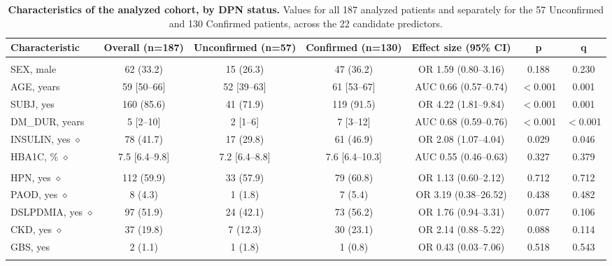 \documentclass[pdflatex,sn-mathphys-num]{sn-jnl}%
\theoremstyle{thmstyleone}%
\theoremstyle{thmstyletwo}%
\theoremstyle{thmstylethree}%
\begin{document}
\begin{table}[!tbp]
    \centering
    \footnotesize
    \caption{\textbf{Characteristics of the analyzed cohort, by DPN status.} Values for
    all 187 analyzed patients and separately for the 57 Unconfirmed and 130 Confirmed patients,
    across the 22 candidate predictors.}
    \label{tab:cohort}
    \setlength{\tabcolsep}{1pt}
    \tiny
    \begin{tabular}{lcccccc}
        \toprule
        \textbf{Characteristic} & \textbf{Overall} (n=187) & \textbf{Unconfirmed} (n=57) & \textbf{Confirmed} (n=130) & \textbf{Effect size (95\% CI)} & \textbf{p} & \textbf{q} \\
        \midrule
        \addlinespace
        \multicolumn{7}{l}{\textit{Profile}} \\
        SEX, male  & 62 (33.2) & 15 (26.3) & 47 (36.2) & OR 1.59 (0.80--3.16) & 0.188 & 0.230 \\
        AGE, years  & 59 [50--66] & 52 [39--63] & 61 [53--67] & AUC 0.66 (0.57--0.74) & $<$0.001 & 0.001 \\
        SUBJ, yes  & 160 (85.6) & 41 (71.9) & 119 (91.5) & OR 4.22 (1.81--9.84) & $<$0.001 & 0.001 \\
        DM\_DUR, years  & 5 [2--10] & 2 [1--6] & 7 [3--12] & AUC 0.68 (0.59--0.76) & $<$0.001 & $<$0.001 \\
        INSULIN, yes $\diamond$ & 78 (41.7) & 17 (29.8) & 61 (46.9) & OR 2.08 (1.07--4.04) & 0.029 & 0.046 \\
        HBA1C, \% $\diamond$ & 7.5 [6.4--9.8] & 7.2 [6.4--8.8] & 7.6 [6.4--10.3] & AUC 0.55 (0.46--0.63) & 0.327 & 0.379 \\
        \addlinespace
        \multicolumn{7}{l}{\textit{Comorbidity}} \\
        HPN, yes $\diamond$ & 112 (59.9) & 33 (57.9) & 79 (60.8) & OR 1.13 (0.60--2.12) & 0.712 & 0.712 \\
        PAOD, yes $\diamond$ & 8 (4.3) & 1 (1.8) & 7 (5.4) & OR 3.19 (0.38--26.52) & 0.438 & 0.482 \\
        DSLPDMIA, yes $\diamond$ & 97 (51.9) & 24 (42.1) & 73 (56.2) & OR 1.76 (0.94--3.31) & 0.077 & 0.106 \\
        CKD, yes $\diamond$ & 37 (19.8) & 7 (12.3) & 30 (23.1) & OR 2.14 (0.88--5.22) & 0.088 & 0.114 \\
        GBS, yes  & 2 (1.1) & 1 (1.8) & 1 (0.8) & OR 0.43 (0.03--7.06) & 0.518 & 0.543 \\
        \addlinespace
        \multicolumn{7}{l}{\textit{Neurological examination}} \\

\end{tabular}
\end{table}
\end{document}
